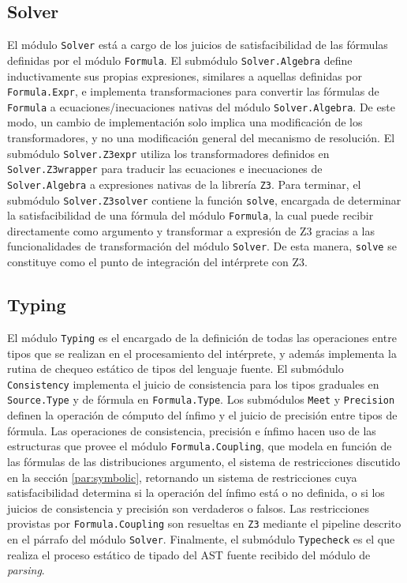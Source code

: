 \subsection{Solver} El módulo \verb|Solver| está a cargo de los
juicios de satisfacibilidad de las fórmulas definidas por el módulo
\verb|Formula|. El submódulo \verb|Solver.Algebra| define inductivamente
sus propias expresiones, similares a aquellas definidas por \verb|Formula.Expr|, e implementa transformaciones para convertir las fórmulas de \verb|Formula| a ecuaciones/inecuaciones nativas del módulo \verb|Solver.Algebra|. De este modo, un cambio de implementación solo implica una modificación de los transformadores, y no una modificación general del mecanismo de resolución. El submódulo \verb|Solver.Z3expr| utiliza los transformadores definidos en \verb|Solver.Z3wrapper| para traducir las ecuaciones e inecuaciones de \verb|Solver.Algebra| a expresiones nativas de la librería \verb|Z3|.
Para terminar, el submódulo \verb|Solver.Z3solver| contiene la función \verb|solve|, encargada de determinar la satisfacibilidad de una fórmula del módulo \verb|Formula|, la cual puede recibir directamente como argumento y transformar a expresión de Z3 gracias a las funcionalidades de transformación del módulo \verb|Solver|. De esta manera, \verb|solve| se constituye como el punto de integración del intérprete con Z3.


\subsection{Typing} El módulo \verb|Typing| es el encargado de la
definición de todas las operaciones entre tipos que se realizan en el
procesamiento del intérprete, y además implementa la rutina de chequeo
estático de tipos del lenguaje fuente. El submódulo \verb|Consistency|
implementa el juicio de consistencia para los tipos graduales en
\verb|Source.Type| y de fórmula en \verb|Formula.Type|. Los submódulos
\verb|Meet| y \verb|Precision| definen la operación de cómputo del
ínfimo y el juicio de precisión entre tipos de fórmula. Las
operaciones de consistencia, precisión e ínfimo hacen uso de las
estructuras que provee el módulo \verb|Formula.Coupling|, que modela
en función de las fórmulas de las distribuciones argumento, el sistema
de restricciones discutido en la sección \ref{par:symbolic},
retornando un sistema de restricciones cuya satisfacibilidad determina si
la operación del ínfimo está o no definida, o si los juicios de
consistencia y precisión son verdaderos o falsos. Las restricciones
provistas por \verb|Formula.Coupling| son resueltas en \verb|Z3|
mediante el pipeline descrito en el párrafo del módulo
\verb|Solver|. Finalmente, el submódulo \verb|Typecheck| es el que
realiza el proceso estático de tipado del AST fuente recibido del
módulo de \emph{parsing}.

